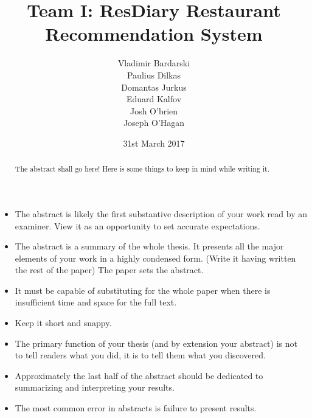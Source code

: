 \documentclass{l3proj}
\begin{document}
\title{Team I: ResDiary Restaurant Recommendation System}

\author{Vladimir Bardarski \\
        Paulius Dilkas \\
        Domantas Jurkus \\
        Eduard Kalfov \\
        Josh O'brien \\
		Joseph O'Hagan}

\date{31st March 2017}

\maketitle

\begin{abstract}
The abstract shall go here! Here is some things to keep in mind while writing it.
\end{abstract}

\begin{itemize}
\item The abstract is likely the first substantive description of your work read by an examiner. View it as an opportunity to set accurate expectations.
\item The abstract is a summary of the whole thesis. It presents all the major elements of your work in a highly condensed form. (Write it having written the rest of the paper) The paper sets the abstract.
\item It must be capable of substituting for the whole paper when there is insufficient time and space for the full text.
\item Keep it short and snappy. 
\item The primary function of your thesis (and by extension your abstract) is not to tell readers what you did, it is to tell them what you discovered.
\item Approximately the last half of the abstract should be dedicated to summarizing and interpreting your results.
\item The most common error in abstracts is failure to present results.
\end{itemize}

\educationalconsent
\newpage
\end{document}
